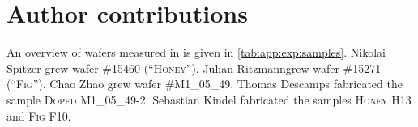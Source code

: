 \chapter*{Author contributions}
An overview of wafers measured in \thispart is given in \cref{tab:app:exp:samples}.
Nikolai Spitzer grew wafer \textsc{\#15460 (\enquote{Honey})}.
Julian Ritzmann\sidenotemark[a] grew wafer \textsc{\#15271 (\enquote{Fig})}.
Chao Zhao grew wafer \textsc{\#M1\_05\_49}.
Thomas Descamps fabricated the sample \textsc{Doped M1\_05\_49-2}.
Sebastian Kindel fabricated the samples \textsc{Honey H13} and \textsc{Fig F10}.

